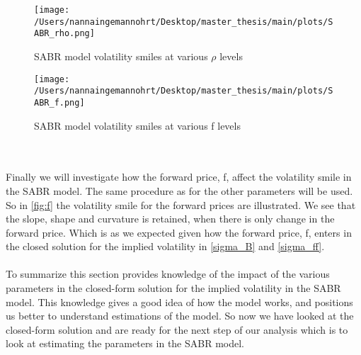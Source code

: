 \begin{figure}[H]
    \centering
    \texttt{[image: /Users/nannaingemannohrt/Desktop/master\_thesis/main/plots/SABR\_rho.png]}
    \caption{SABR model volatility smiles at various $\rho$ levels}
    \label{fig:rho}
\end{figure}

\begin{figure}[H]
    \centering
    \texttt{[image: /Users/nannaingemannohrt/Desktop/master\_thesis/main/plots/SABR\_f.png]}
    \caption{SABR model volatility smiles at various f levels}
    \label{fig:f}
\end{figure}
\noindent
\\\\
Finally we will investigate how the forward price, f, affect the volatility smile in the SABR model. 
The same procedure as for the other parameters will be used. So in \autoref{fig:f} the volatility smile
for the forward prices are illustrated. We see that the slope, shape and curvature is retained, when there
is only change in the forward price. Which is as we expected given how the forward price, f, enters in the closed
solution for the implied volatility in \autoref{sigma_B} and \autoref{sigma_ff}.
\\\\
To summarize this section provides knowledge of the impact of the various parameters in the closed-form solution
for the implied volatility in the SABR model. This knowledge gives a good idea of how the model works, and 
positions us better to understand estimations of the model. So now we have looked at the closed-form solution and 
are ready for the next step of our analysis which is to look at  estimating the parameters in the SABR model.
\newpage
